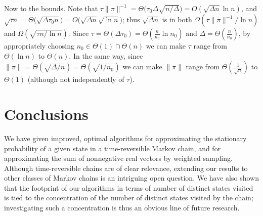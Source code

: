 \documentclass[a4paper,11pt]{article}
\begin{document}
Now to the bounds. Note that
$\tau\|\pi\|^{-1} = \Theta\big(\tau_0 \Delta \sqrt{n/\Delta}\big) = O(\sqrt{\Delta n} \ln{n})$,
and
$\sqrt{\tau n} = \Theta\big(\sqrt{\Delta \tau_0 n}\big) = O\big(\sqrt{\Delta n}\sqrt{\ln{n}}\big)$;
thus $\sqrt{\Delta n}$ is in both $\Omega(\tau\|\pi\|^{-1} / \ln{n})$ and $\Omega(\sqrt{\tau n / \ln{n}})$.
Since $\tau =\Theta(\Delta\tau_0) = \Theta(\frac{n}{n_0}\ln{n_0})$ and $\Delta = \Theta(\frac{n}{n_0})$, by appropriately choosing $n_0 \in \Theta(1) \cap \Theta(n)$ we can make $\tau$ range from $\Theta(\ln{n})$ to $\Theta(n)$.
In the same way, since $\|\pi\| = \Theta(\sqrt{\Delta/n}) = \Theta(\sqrt{1/n_0})$ we can make $\|\pi\|$ range from $\Theta(\frac{1}{\sqrt{n}})$ to $\Theta(1)$ (although not independently of $\tau$).



\section{Conclusions}
\label{sec:conc}
We have given improved, optimal algorithms for approximating the stationary probability of a given state in a time-reversible Markov chain, and for approximating the sum of nonnegative real vectors by weighted sampling.
Although time-reversible chains are of clear relevance, extending our results to other classes of Markov chains is an intriguing open question.
We have also shown that the footprint of our algorithms in terms of number of distinct states visited is tied to the concentration of the number of distinct states visited by the chain; investigating such a concentration is thus an obvious line of future research.

\clearpage




\clearpage



%

%
\end{document}
